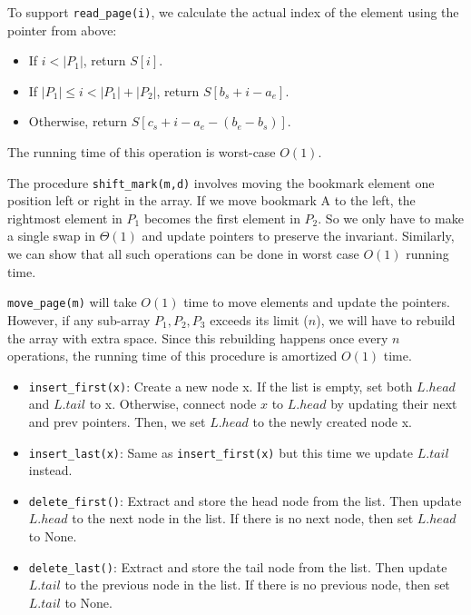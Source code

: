 \documentclass[12pt,twoside]{article}
\begin{document}
\begin{problems}
To support \lstinline{read_page(i)}, we calculate the actual index of the element using the pointer from above:

\begin{itemize}
	\item \quad If $i < |P_1| $, return $S[i]$.
	\item \quad If $|P_1| \leq i < |P_1| + |P_2|$, return $S[b_s + i - a_e]$.
	\item \quad Otherwise, return $S[c_s + i - a_e - (b_e - b_s)]$.  
\end{itemize}

The running time of this operation is worst-case $O(1)$.

The procedure \lstinline{shift_mark(m,d)} involves moving the bookmark element one position left or right in the array. If we move bookmark A to the left, the rightmost element in $P_1$ becomes the first element in $P_2$. So we only have to make a single swap in $\Theta(1)$ and update pointers to preserve the invariant. Similarly, we can show that all such operations can be done in worst case $O(1)$ running time.

\lstinline{move_page(m)} will take $O(1)$ time to move elements and update the pointers. However, if any sub-array $P_1, P_2, P_3$ exceeds its limit ($n$), we will have to rebuild the array with extra space. Since this rebuilding happens once every $n$ operations, the running time of this procedure is amortized $O(1)$ time.




\newpage
\problem  %

\begin{problemparts}
\problempart %

\begin{itemize}
	\item  \lstinline{insert_first(x)}: Create a new node x. If the list is empty, set both $L.head$ and $L.tail$ to x. Otherwise, connect node $x$ to $L.head$ by updating their next and prev pointers. Then, we set $L.head$ to the newly created node x.
	\item \lstinline{insert_last(x)}: Same as \lstinline{insert_first(x)} but this time we update $L.tail$ instead.
	\item \lstinline{delete_first()}: Extract and store the head node from the list. Then update $L.head$ to the next node in the list. If there is no next node, then set $L.head$ to None.
	\item \lstinline{delete_last()}: Extract and store the tail node from the list. Then update $L.tail$ to the previous node in the list. If there is no previous node, then set $L.tail$ to None.
\end{itemize}



\end{problemparts}
\end{problems}
\end{document}
